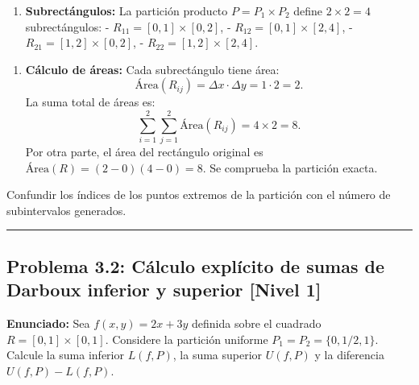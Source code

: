 \documentclass[11pt,a4paper]{article}
\begin{document}
\begin{enumerate}[label=\textbf{\arabic*.}]
\item \textbf{Subrectángulos:}
La partición producto $P = P_1 \times P_2$ define $2 \times 2 = 4$ subrectángulos:
- $R_{11} = [0, 1] \times [0, 2]$,
- $R_{12} = [0, 1] \times [2, 4]$,
- $R_{21} = [1, 2] \times [0, 2]$,
- $R_{22} = [1, 2] \times [2, 4]$.
\end{enumerate}

\begin{enumerate}[label=\textbf{\arabic*.}]
\item \textbf{Cálculo de áreas:}
Cada subrectángulo tiene área:
\begin{equation*}
\text{Área}(R_{ij}) = \Delta x \cdot \Delta y = 1 \cdot 2 = 2.
\end{equation*}
La suma total de áreas es:
\begin{equation*}
\sum_{i=1}^2 \sum_{j=1}^2 \text{Área}(R_{ij}) = 4 \times 2 = 8.
\end{equation*}
Por otra parte, el área del rectángulo original es $\text{Área}(R) = (2 - 0)(4 - 0) = 8$. Se comprueba la partición exacta.
\end{enumerate}

\begin{trapbox}
Confundir los índices de los puntos extremos de la partición con el número de subintervalos generados.
\end{trapbox}

\vspace{0.5cm}
\hrule
\vspace{0.5cm}

\subsection*{Problema 3.2: Cálculo explícito de sumas de Darboux inferior y superior \hfill \color{primaryblue}\small[Nivel 1]}

\begin{tcolorbox}[colback=white,colframe=gray!40,arc=1mm,boxrule=0.5pt,left=3mm,right=3mm,top=2mm,bottom=2mm]
\textbf{Enunciado:} Sea $f(x,y) = 2x + 3y$ definida sobre el cuadrado $R = [0, 1] \times [0, 1]$. Considere la partición uniforme $P_1 = P_2 = \{0, 1/2, 1\}$. Calcule la suma inferior $L(f,P)$, la suma superior $U(f,P)$ y la diferencia $U(f,P) - L(f,P)$.
\end{tcolorbox}
\end{document}
